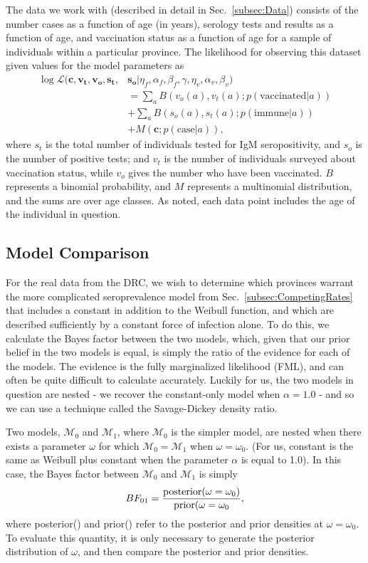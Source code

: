 \documentclass[nofootinbib,aps,pre,twocolumn,superscriptaddress,showkeys,showpacs]{revtex4-1}
\begin{document}
The data we work with (described in detail in Sec.~\ref{subsec:Data}) consists of the number cases as a function of age (in years), serology tests and results as a function of age, and vaccination status as a function of age for a sample of individuals within a particular province. The likelihood for observing this dataset given values for the model parameters as
\begin{align}
\log \mathcal{L} (\mathbf{c}, \mathbf{v_t}, \mathbf{v_o}, \mathbf{s_t},&\mathbf{s_o}|\eta_f, \alpha_f, \beta_f, \gamma, \eta_v, \alpha_v, \beta_v)\nonumber \\ 
& = \sum_aB\left(v_o(a), v_t(a); p(\mathrm{vaccinated}|a)\right) \nonumber \\
&+ \sum_a B\left(s_o(a),s_t(a);p(\mathrm{immune}|a)\right) \nonumber \\
&+ M\left(\mathbf{c};p(\mathrm{case}|a)\right),
\label{eq:loglike}
\end{align}
where $s_t$ is the total number of individuals tested for IgM seropositivity, and $s_o$ is the number of positive tests; and $v_t$ is the number of individuals surveyed about vaccination status, while $v_o$ gives the number who have been vaccinated. $B$ represents a binomial probability, and $M$ represents a multinomial distribution, and the sums are over age classes. As noted, each data point includes the age of the individual in question.

\subsection{Model Comparison\label{subsec:BF}}
For the real data from the DRC, we wish to determine which provinces warrant the more complicated seroprevalence model from Sec.~\ref{subsec:CompetingRates} that includes a constant in addition to the Weibull function, and which are described sufficiently by a constant force of infection alone. To do this, we calculate the Bayes factor between the two models, which, given that our prior belief in the two models is equal, is simply the ratio of the evidence for each of the models. The evidence is the fully marginalized likelihood (FML), and can often be quite difficult to calculate accurately. Luckily for us, the two models in question are nested - we recover the constant-only model when $\alpha = 1.0$ -  and so we can use a technique called the Savage-Dickey density ratio.

Two models, $\mathcal{M}_0$ and $\mathcal{M}_1$, where $\mathcal{M}_0$ is the simpler model, are nested when there exists a parameter $\omega$ for which $\mathcal{M}_0 = \mathcal{M}_1$ when $\omega = \omega_0$. (For us, constant is the same as Weibull plus constant when the parameter $\alpha$ is equal to 1.0). In this case, the Bayes factor between $\mathcal{M}_0$ and $\mathcal{M}_1$ is simply
\begin{equation}
BF_{01} = \frac{\rm{posterior}(\omega =\omega_0)}{\rm{prior}(\omega=\omega_0},
\end{equation}
where posterior() and prior() refer to the posterior and prior densities at $\omega = \omega_0$. To evaluate this quantity, it is only necessary to generate the posterior distribution of $\omega$, and then compare the posterior and prior densities.
\end{document}
